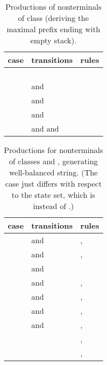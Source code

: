 \documentclass[3p,11pt]{elsarticle}
\begin{document}
\begin{table}[h!]
\caption{\label{productionsY}Productions of nonterminals of class  (deriving the maximal prefix ending with empty stack). }
\renewcommand{\arraystretch}{1.3}
\begin{tabular}{l|p{6cm}|l}
  case & transitions  & rules \\
  \hline
  &  &     \\

     &  &   \\

     &  &   \\

     &  & \\

    &  and   & \\

    &  and   & \\

  &  and  & \\

   &  and  and  &  \\

  \hline
\end{tabular}
\end{table}
\begin{table}[h!]
\caption{\label{productionsB}Productions for  nonterminals of classes  and , generating well-balanced string. (The case  just differs with respect to the state set, which is  instead of .) }
\renewcommand{\arraystretch}{1.3}
\begin{tabular}{l|p{}|p{}}
  case & transitions  & rules \\
  \hline
  &  and 
                   & , \\


    &    and 
                        & ,  \\

   &    and 
                        &  \\


    &  and 
                      & ,  \\

 &  and 
                   & ,  \\

   &    and  & ,   \\


  &  and   & ,   \\

    &  & ,  \\

      &  & ,  \\\hline
\end{tabular}
\end{table}
\end{document}
